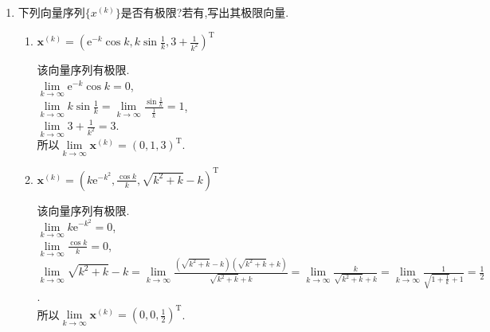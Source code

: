 \documentclass[a4paper]{article}
\begin{document}
\courseheader
{}

\begin{enumerate}
  \setlength{\itemsep}{4\parskip}

  \item 下列向量序列$\{x^{(k)}\}$是否有极限?若有,写出其极限向量.
  \begin{enumerate}[label=(\arabic*)]
    \item $\boldsymbol{x}^{(k)}=\left(\mathrm{e}^{-k}\cos k,k\sin\frac{1}{k},3+\frac{1}{k^{2}}\right)^{\mathrm{T}}$
    \begin{solution}
      该向量序列有极限.\\
      $\lim\limits_{k\to\infty}\mathrm{e}^{-k}\cos k=0$,\\
      $\lim\limits_{k\to\infty}k\sin\frac{1}{k}=\lim\limits_{k\to\infty}\frac{\sin\frac{1}{k}}{\frac{1}{k}}=1$,\\
      $\lim\limits_{k\to\infty}3+\frac{1}{k^{2}}=3$.\\
      所以$\lim\limits_{k\to\infty}\boldsymbol{x}^{(k)}=\left(0,1,3\right)^{\mathrm{T}}$.
    \end{solution}
    \item $\boldsymbol{x}^{(k)}=\left(k\mathrm{e}^{-k^{2}},\frac{\cos k}{k},\sqrt{k^{2}+k}-k\right)^{\mathrm{T}}$
    \begin{solution}
      该向量序列有极限.\\
      $\lim\limits_{k\to\infty}k\mathrm{e}^{-k^{2}}=0$,\\
      $\lim\limits_{k\to\infty}\frac{\cos k}{k}=0$,\\
      $\lim\limits_{k\to\infty}\sqrt{k^{2}+k}-k=\lim\limits_{k\to\infty}\frac{(\sqrt{k^{2}+k}-k)(\sqrt{k^{2}+k}+k)}{\sqrt{k^{2}+k}+k}=\lim\limits_{k\to\infty}\frac{k}{\sqrt{k^{2}+k}+k}=\lim\limits_{k\to\infty}\frac{1}{\sqrt{1+\frac{1}{k}}+1}=\frac{1}{2}$.\\
      所以$\lim\limits_{k\to\infty}\boldsymbol{x}^{(k)}=\left(0,0,\frac{1}{2}\right)^{\mathrm{T}}$.
    \end{solution}
    
  \end{enumerate}


\end{enumerate}
\end{document}

